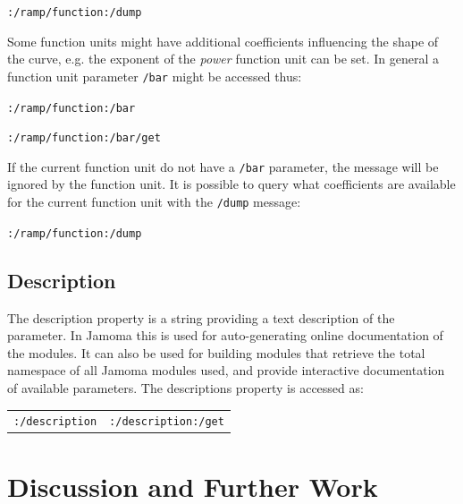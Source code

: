 \documentclass{NIME-alternate}
\begin{document}
\texttt{:/ramp/function:/dump}

Some function units might have additional coefficients influencing the shape of the curve, e.g. the exponent of the \emph{power} function unit can be set. In general a function unit parameter \texttt{/bar} might be accessed thus:

\texttt{:/ramp/function:/bar}

\texttt{:/ramp/function:/bar/get}

If the current function unit do not have a \texttt{/bar} parameter, the message will be ignored by the function unit. It is possible to query what coefficients are available for the current function unit with the \texttt{/dump} message:

\texttt{:/ramp/function:/dump}








\subsection{Description} %
\label{sub:description}

The description property is a string providing a text description of the parameter. In Jamoma this is used for auto-generating online documentation of the modules. It can also be used for building modules that retrieve the total namespace of all Jamoma modules used, and provide interactive documentation of available parameters. The descriptions property is accessed as:

\begin{tabular}{ll}
	\texttt{:/description} & \texttt{:/description:/get} \\
\end{tabular}







\section{Discussion and Further Work} %
\label{sec:discussion_and_further_work}   
\end{document}
